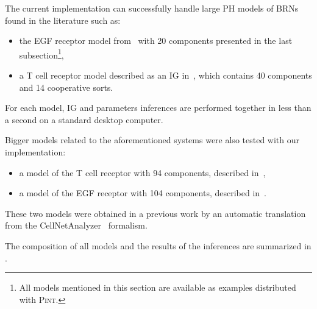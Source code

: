 The current implementation can successfully handle large PH models of BRNs found in the literature such as:
\begin{itemize}
  \item the EGF receptor model from~\cite{Sahin09} with 20 components presented in the last
    subsection\footnote{All models mentioned in this section are available as examples distributed with \textsc{Pint}.},
  \item a T cell receptor model described as an IG in~\cite{Klamt06}, which contains 40 components and 14 cooperative sorts.
\end{itemize}
For each model, IG and parameters inferences are performed together in less than a second
on a standard desktop computer.

Bigger models related to the aforementioned systems were also tested with our implementation:
\begin{itemize}
  \item a model of the T cell receptor with 94 components, described in~\cite{SaezRodriguez2007},
  \item a model of the EGF receptor with 104 components, described in~\cite{Samaga2009}.
\end{itemize}
These two models were obtained in a previous work by an automatic translation from the CellNetAnalyzer~\cite{klamt2007structural} formalism.

The composition of all models and the results of the inferences are summarized in .
%

